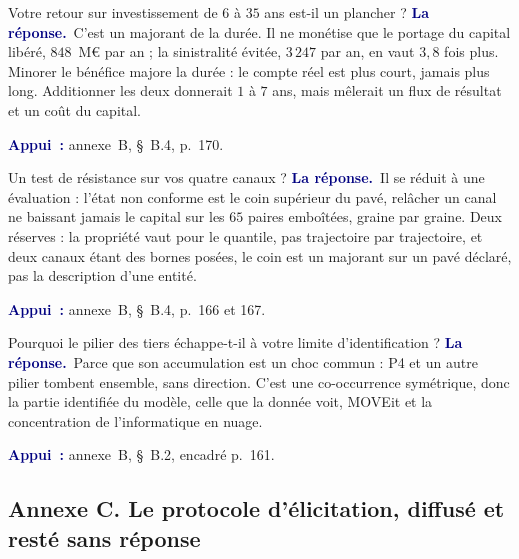 \documentclass[11pt,a4paper]{article}
\newcommand{\rep}[1]{\smallskip\noindent\textcolor{navy}{\textbf{La réponse.}}\ #1\par}
\newcommand{\appui}[1]{\smallskip\noindent\small\textcolor{navy}{\textbf{Appui~:}} #1\par\normalsize}
\begin{document}
\begin{question}{\og Votre retour sur investissement de $6$ à $35$ ans est-il un plancher ?\fg{}}
\rep{C'est un majorant de la durée. Il ne monétise que le portage du capital libéré, $848$~M\euro{}
par an ; la sinistralité évitée, $3\,247$ par an, en vaut $3{,}8$ fois plus. Minorer le bénéfice
majore la durée : le compte réel est plus court, jamais plus long. Additionner les deux donnerait
$1$ à $7$ ans, mais mêlerait un flux de résultat et un coût du capital.}
\appui{annexe~B, \S~B.4, p.~170.}
\end{question}

\begin{question}{\og Un test de résistance sur vos quatre canaux ?\fg{}}
\rep{Il se réduit à une évaluation : l'état non conforme est le coin supérieur du pavé, relâcher un
canal ne baissant jamais le capital sur les $65$ paires emboîtées, graine par graine. Deux
réserves : la propriété vaut pour le quantile, pas trajectoire par trajectoire, et deux canaux
étant des bornes posées, le coin est un majorant sur un pavé déclaré, pas la description d'une
entité.}
\appui{annexe~B, \S~B.4, p.~166 et 167.}
\end{question}

\begin{question}{\og Pourquoi le pilier des tiers échappe-t-il à votre limite d'identification ?\fg{}}
\rep{Parce que son accumulation est un choc commun : P4 et un autre pilier tombent ensemble, sans
direction. C'est une co-occurrence symétrique, donc la partie identifiée du modèle, celle que la
donnée voit, MOVEit et la concentration de l'informatique en nuage.}
\appui{annexe~B, \S~B.2, encadré p.~161.}
\end{question}

\subsection*{Annexe C. Le protocole d'élicitation, diffusé et resté sans réponse}
\end{document}
